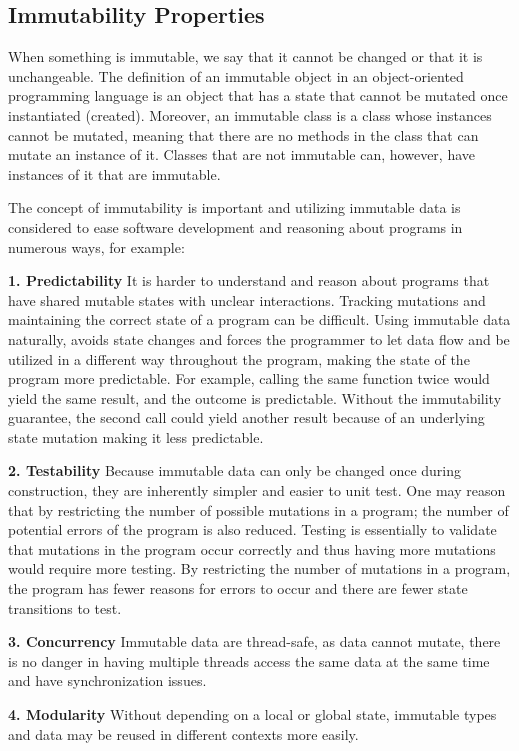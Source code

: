 \documentclass[conference]{IEEEtran}
\begin{document}
\subsection{Immutability Properties}
When something is immutable, we say that it cannot be changed or that it is unchangeable. The definition
of an immutable object in an object-oriented programming language is an object that has a state
that cannot be mutated once instantiated (created). Moreover, an immutable class is a class whose instances
cannot be mutated, meaning that there are no methods in the class that can mutate an instance
of it. Classes that are not immutable can, however, have instances of it that are immutable. 

The concept of immutability is important and
utilizing immutable data is considered to ease software development and reasoning about programs in
numerous ways, for example:

\textbf{1. Predictability} It is harder to understand and reason about programs that have shared mutable
states with unclear interactions. Tracking mutations and maintaining the correct state of a program
can be difficult. Using immutable data naturally, avoids state changes and forces the programmer
to let data flow and be utilized in a different way throughout the program, making the state of the
program more predictable. For example, calling the same function twice would yield the same result,
and the outcome is predictable. Without the immutability guarantee, the second call could
yield another result because of an underlying state mutation making it less predictable.

\textbf{2. Testability} Because immutable data can only be changed once during construction, they are inherently
simpler and easier to unit test. One may reason that by restricting the number of possible mutations
in a program; the number of potential errors of the program is also reduced. Testing is essentially
to validate that mutations in the program occur correctly and thus having more mutations would require more testing. By restricting the number of mutations in a program, the program has
fewer reasons for errors to occur and there are fewer state transitions to test.

\textbf{3. Concurrency} Immutable data are thread-safe, as data cannot mutate, there is no danger in having
multiple threads access the same data at the same time and have synchronization issues.

\textbf{4. Modularity} Without depending on a local or global state, immutable types and data may be reused
in different contexts more easily.
\end{document}
